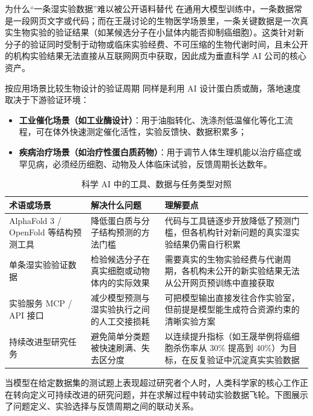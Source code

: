 \documentclass[UTF8,a4paper,11pt,fontset=fandol]{ctexart}
\begin{document}
\begin{knowledgebox}{为什么“一条湿实验数据”难以被公开语料替代}
在通用大模型训练中，一条数据常是一段网页文字或代码；而在王晟讨论的生物医学场景里，一条关键数据是一次真实生物实验的验证结果（如某候选分子在小鼠体内能否抑制癌细胞）。这类针对新分子的验证同时受制于动物或临床实验经费、不可压缩的生物代谢时间，且未公开的机构实验结果无法直接从互联网网页中获取，因此成为垂直科学 AI 公司的核心资产。
\end{knowledgebox}
\begin{warningbox}{按应用场景比较生物设计的验证周期}
同样是利用 AI 设计蛋白质或酶，落地速度取决于下游验证环境：
\begin{itemize}
\item \textbf{工业催化场景（如工业酶设计）}：用于油脂转化、洗涤剂低温催化等化工流程，可在体外快速测定催化活性，实验反馈快、数据积累多；
\item \textbf{疾病治疗场景（如治疗性蛋白质药物）}：用于调节人体生理机能以治疗癌症或罕见病，必须经历细胞、动物及人体临床试验，反馈周期长达数年。
\end{itemize}
\end{warningbox}
\begin{table}[H]\centering\small
\caption{科学 AI 中的工具、数据与任务类型对照}
\begin{tabular}{>{\raggedright\arraybackslash}p{\dimexpr(\linewidth-6\tabcolsep)/3\relax}>{\raggedright\arraybackslash}p{\dimexpr(\linewidth-6\tabcolsep)/3\relax}>{\raggedright\arraybackslash}p{\dimexpr(\linewidth-6\tabcolsep)/3\relax}}
\toprule
术语或场景 & 解决什么问题 & 理解要点\\\midrule
AlphaFold 3 / OpenFold 等结构预测工具 & 降低蛋白质与分子结构预测的方法门槛 & 代码与工具链逐步开放降低了预测门槛，但各机构针对新问题的真实湿实验结果仍需自行积累\\[4pt]
单条湿实验验证数据 & 检验候选分子在真实细胞或动物体内的实际效果 & 需要真实的生物实验经费与代谢周期，各机构未公开的新实验结果无法从公开网页预训练中直接获取\\[4pt]
实验服务 MCP / API 接口 & 减少模型预测与湿实验执行之间的人工交接损耗 & 可把模型输出直接发往合作实验室，但前提是模型能生成符合资源约束的清晰实验方案\\[4pt]
持续改进型研究任务 & 避免简单分类题被快速刷满、失去区分度 & 以连续提升指标（如王晟举例将癌细胞杀伤率从 30\% 提高到 40\%）为目标，在反复验证中沉淀真实实验数据\\[4pt]
\bottomrule\end{tabular}\end{table}
当模型在给定数据集的测试题上表现超过研究者个人时，人类科学家的核心工作正在转向定义可持续改进的研究问题，并在求解过程中转动实验数据飞轮。下图展示了问题定义、实验选择与反馈周期之间的联动关系。
\end{document}
